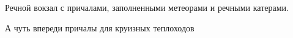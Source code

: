 
 
 
 
 

Речной вокзал с причалами, заполненными метеорами и речными катерами.

А чуть впереди причалы для круизных теплоходов
